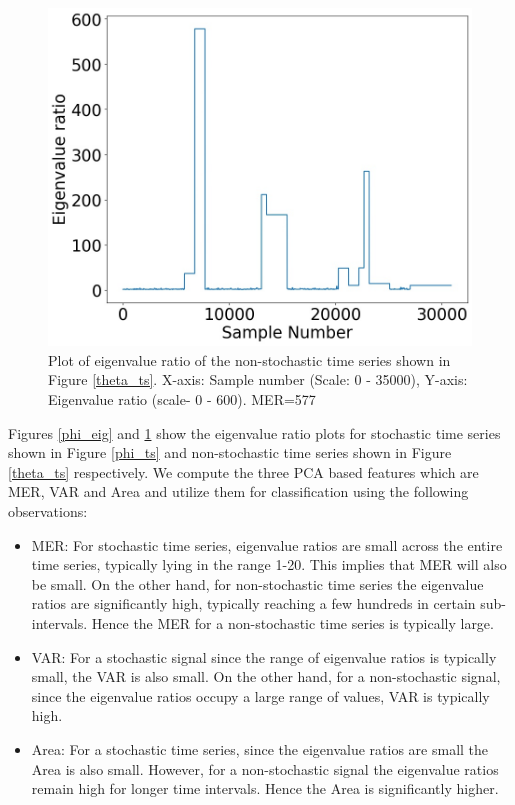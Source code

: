 \documentclass[10pt,conference]{IEEEtran}
\begin{document}
\begin{figure}[ht]
\centering
\includegraphics[width=1\linewidth]{sac_ascf_theta_eig.jpg}
\caption{Plot of eigenvalue ratio of the  non-stochastic time series shown in Figure \ref{theta_ts}. X-axis: Sample number (Scale: 0 - 35000), Y-axis: Eigenvalue ratio (scale- 0 - 600). MER=577 }
\label{theta_eig}
\end{figure}

Figures \ref{phi_eig} and \ref{theta_eig} show the eigenvalue ratio plots for stochastic time series shown in Figure \ref{phi_ts} and  non-stochastic time series shown in Figure \ref{theta_ts} respectively. We compute the three PCA based features which are MER, VAR and Area  and utilize them for classification using the following observations:

\begin{itemize}
\item MER: For stochastic time series, eigenvalue ratios  are small across the entire time series, typically lying in the range 1-20. This implies that MER  will also be small. On the other hand, for  non-stochastic time series the eigenvalue ratios are significantly high, typically reaching a few hundreds in certain sub-intervals. Hence the MER for a non-stochastic time series is typically large.
\item VAR: For a stochastic signal since the range of eigenvalue ratios is typically small, the VAR is also small. On the other hand, for a non-stochastic signal, since the eigenvalue ratios occupy a large range of values, VAR is typically high.
\item Area: For a stochastic time series, since the eigenvalue ratios  are small the Area is also small. However, for a non-stochastic signal the eigenvalue ratios remain high for longer time intervals. Hence the Area is significantly higher.
\end{itemize}
\end{document}
